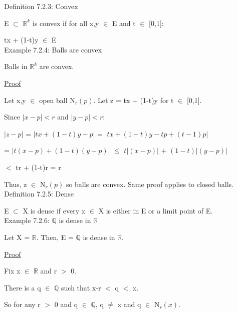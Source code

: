 { \color{blue} Definition 7.2.3: Convex } 

	\begin{adjustbox}{minipage=14cm, right, vspace=0.1cm 0cm}
		E $\subset$ $\mathbb{R}^k$ is {\color{lblue} convex} if for all
		x,y $\in$ E and t $\in$ [0,1]:

		\qquad tx + (1-t)y $\in$ E \\
	\end{adjustbox}

{ \color{purple} Example 7.2.4: Balls are convex }

	\begin{adjustbox}{minipage=14cm, right, vspace=0.1cm 0cm}
		Balls in $\mathbb{R}^k$ are convex.
	\end{adjustbox}

{ \color{magenta} \underline{Proof} }

	Let x,y $\in$ open ball N$_r(p)$. Let z = tx + (1-t)y for t $\in$ [0,1].
	
	Since $|x - p| < r$ and $|y - p| < r$:

	\hspace{1cm} $|z - p|$ = $|tx + (1-t)y - p|$ = $|tx + (1-t)y - tp + (t-1)p|$

	\hspace{2.3cm} = $|t(x-p) + (1-t)(y-p)|$ $\leq$ $t|(x-p)|$ + $(1-t)|(y-p)|$

	\hspace{2.3cm} $<$ tr + (1-t)r = r

	Thus, z $\in$ N$_r(p)$ so balls are convex. Same proof applies to closed balls. \\

{ \color{blue} Definition 7.2.5: Dense } 

	\begin{adjustbox}{minipage=14cm, right, vspace=0.1cm 0cm}
		E $\subset$ X is dense if every x $\in$ X is either in E or
		a limit point of E. \\
	\end{adjustbox}

{ \color{purple} Example 7.2.6: $\mathbb{Q}$ is dense in $\mathbb{R}$ } 

	\qquad Let X = $\mathbb{R}$.
	Then, E = $\mathbb{Q}$ is dense in $\mathbb{R}$.

{ \color{magenta} \underline{Proof} } 

	Fix x $\in$ $\mathbb{R}$ and r $>$ 0.

	There is a q $\in$ $\mathbb{Q}$ such that x-r $<$ q $<$ x.

	So for any r $>$ 0 and q $\in$ $\mathbb{Q}$, q $\neq$ x and
	q $\in$ N$_r(x)$.

